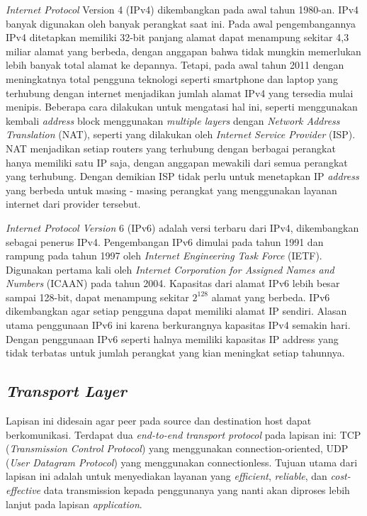 \emph{Internet Protocol} Version 4 (IPv4) dikembangkan pada awal tahun 1980-an. IPv4 banyak digunakan oleh banyak perangkat saat ini. Pada awal pengembangannya IPv4 ditetapkan memiliki 32-bit panjang alamat dapat menampung sekitar 4,3 miliar alamat yang berbeda, dengan anggapan bahwa tidak mungkin memerlukan lebih banyak total alamat ke depannya. Tetapi, pada awal tahun 2011 dengan meningkatnya total pengguna teknologi seperti smartphone dan laptop yang terhubung dengan internet menjadikan jumlah alamat IPv4 yang tersedia mulai menipis. Beberapa cara dilakukan untuk mengatasi hal ini, seperti menggunakan kembali \emph{address} block menggunakan \emph{multiple layers} dengan \emph{Network Address Translation} (NAT), seperti yang dilakukan oleh \emph{Internet Service Provider} (ISP). NAT menjadikan setiap routers yang terhubung dengan berbagai perangkat hanya memiliki satu IP saja, dengan anggapan mewakili dari semua perangkat yang terhubung. Dengan demikian ISP tidak perlu untuk menetapkan IP \emph{address} yang berbeda untuk masing - masing perangkat yang menggunakan layanan internet dari provider tersebut.

\emph{Internet Protocol Version} 6 (IPv6) adalah versi terbaru dari IPv4, dikembangkan sebagai penerus IPv4. Pengembangan IPv6 dimulai pada tahun 1991 dan rampung pada tahun 1997 oleh \emph{Internet Engineering Task Force} (IETF). Digunakan pertama kali oleh \emph{Internet Corporation for Assigned Names and Numbers} (ICAAN) pada tahun 2004. Kapasitas dari alamat IPv6 lebih besar sampai 128-bit, dapat menampung sekitar $2^{128}$ alamat yang berbeda. IPv6 dikembangkan agar setiap pengguna dapat memiliki alamat IP sendiri. Alasan utama penggunaan IPv6 ini karena berkurangnya kapasitas IPv4 semakin hari. Dengan penggunaan IPv6 seperti halnya memiliki kapasitas IP address yang tidak terbatas untuk jumlah perangkat yang kian meningkat setiap tahunnya.

\nocite{babatunde2014review}

\subsection{\emph{Transport Layer}}

Lapisan ini didesain agar peer pada source dan destination host dapat berkomunikasi. Terdapat dua \emph{end-to-end transport protocol} pada lapisan ini: TCP (\emph{Transmission Control Protocol}) yang menggunakan connection-oriented, UDP (\emph{User Datagram Protocol}) yang menggunakan connectionless. Tujuan utama dari lapisan ini adalah untuk menyediakan layanan yang \emph{efficient}, \emph{reliable}, dan \emph{cost-effective} data transmission kepada penggunanya yang nanti akan diproses lebih lanjut pada lapisan \emph{application}.

